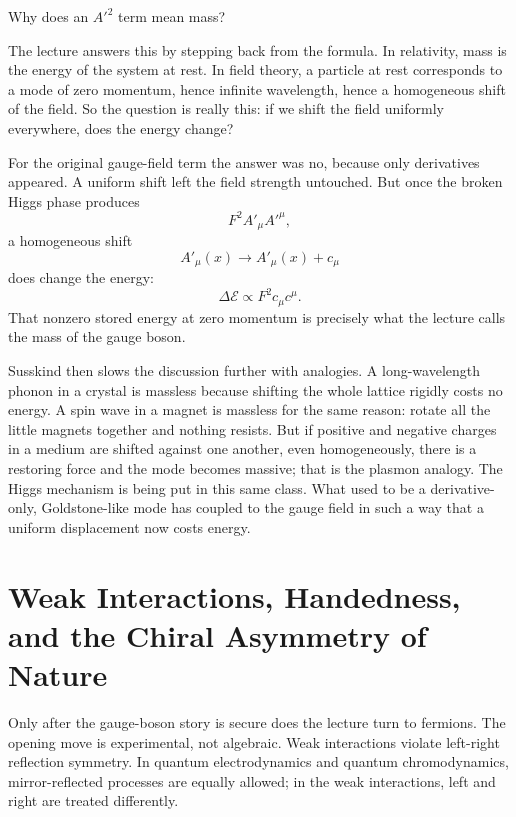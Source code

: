 Why does an \(A'^2\) term mean mass?

The lecture answers this by stepping back from the formula. In relativity, mass is the energy of the system at rest. In field theory, a particle at rest corresponds to a mode of zero momentum, hence infinite wavelength, hence a homogeneous shift of the field. So the question is really this: if we shift the field uniformly everywhere, does the energy change?

For the original gauge-field term the answer was no, because only derivatives appeared. A uniform shift left the field strength untouched. But once the broken Higgs phase produces
\begin{equation}
F^2 A'_\mu A'^\mu,
\end{equation}
a homogeneous shift
\begin{equation}
A'_\mu(x)\longrightarrow A'_\mu(x)+c_\mu
\end{equation}
does change the energy:
\begin{equation}
\Delta \mathcal{E}\propto F^2 c_\mu c^\mu.
\end{equation}
That nonzero stored energy at zero momentum is precisely what the lecture calls the mass of the gauge boson.

Susskind then slows the discussion further with analogies. A long-wavelength phonon in a crystal is massless because shifting the whole lattice rigidly costs no energy. A spin wave in a magnet is massless for the same reason: rotate all the little magnets together and nothing resists. But if positive and negative charges in a medium are shifted against one another, even homogeneously, there is a restoring force and the mode becomes massive; that is the plasmon analogy. The Higgs mechanism is being put in this same class. What used to be a derivative-only, Goldstone-like mode has coupled to the gauge field in such a way that a uniform displacement now costs energy.

\section{Weak Interactions, Handedness, and the Chiral Asymmetry of Nature}

Only after the gauge-boson story is secure does the lecture turn to fermions. The opening move is experimental, not algebraic. Weak interactions violate left-right reflection symmetry. In quantum electrodynamics and quantum chromodynamics, mirror-reflected processes are equally allowed; in the weak interactions, left and right are treated differently.


